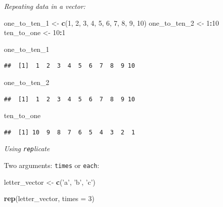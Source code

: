 \documentclass[
]{book}
\newenvironment{Shaded}{\begin{snugshade}}{\end{snugshade}}
\newcommand{\DataTypeTok}[1]{\textcolor[rgb]{0.13,0.29,0.53}{#1}}
\newcommand{\DecValTok}[1]{\textcolor[rgb]{0.00,0.00,0.81}{#1}}
\newcommand{\KeywordTok}[1]{\textcolor[rgb]{0.13,0.29,0.53}{\textbf{#1}}}
\newcommand{\NormalTok}[1]{#1}
\newcommand{\OperatorTok}[1]{\textcolor[rgb]{0.81,0.36,0.00}{\textbf{#1}}}
\newcommand{\StringTok}[1]{\textcolor[rgb]{0.31,0.60,0.02}{#1}}
\begin{document}
\emph{Repeating data in a vector:}

\begin{Shaded}
\begin{Highlighting}[]
\NormalTok{one_to_ten_}\DecValTok{1}\NormalTok{ <-}\StringTok{ }\KeywordTok{c}\NormalTok{(}\DecValTok{1}\NormalTok{, }\DecValTok{2}\NormalTok{, }\DecValTok{3}\NormalTok{, }\DecValTok{4}\NormalTok{, }\DecValTok{5}\NormalTok{, }\DecValTok{6}\NormalTok{, }\DecValTok{7}\NormalTok{, }\DecValTok{8}\NormalTok{, }\DecValTok{9}\NormalTok{, }\DecValTok{10}\NormalTok{)}
\NormalTok{one_to_ten_}\DecValTok{2}\NormalTok{ <-}\StringTok{ }\DecValTok{1}\OperatorTok{:}\DecValTok{10}
\NormalTok{ten_to_one <-}\StringTok{ }\DecValTok{10}\OperatorTok{:}\DecValTok{1}

\NormalTok{one_to_ten_}\DecValTok{1}
\end{Highlighting}
\end{Shaded}

\begin{verbatim}
##  [1]  1  2  3  4  5  6  7  8  9 10
\end{verbatim}

\begin{Shaded}
\begin{Highlighting}[]
\NormalTok{one_to_ten_}\DecValTok{2}
\end{Highlighting}
\end{Shaded}

\begin{verbatim}
##  [1]  1  2  3  4  5  6  7  8  9 10
\end{verbatim}

\begin{Shaded}
\begin{Highlighting}[]
\NormalTok{ten_to_one}
\end{Highlighting}
\end{Shaded}

\begin{verbatim}
##  [1] 10  9  8  7  6  5  4  3  2  1
\end{verbatim}

\emph{Using \texttt{rep}licate}

Two arguments: \texttt{times} or \texttt{each}:

\begin{Shaded}
\begin{Highlighting}[]
\NormalTok{letter_vector <-}\StringTok{ }\KeywordTok{c}\NormalTok{(}\StringTok{'a'}\NormalTok{, }\StringTok{'b'}\NormalTok{, }\StringTok{'c'}\NormalTok{)}

\KeywordTok{rep}\NormalTok{(letter_vector, }\DataTypeTok{times =} \DecValTok{3}\NormalTok{)}
\end{Highlighting}
\end{Shaded}
\end{document}
